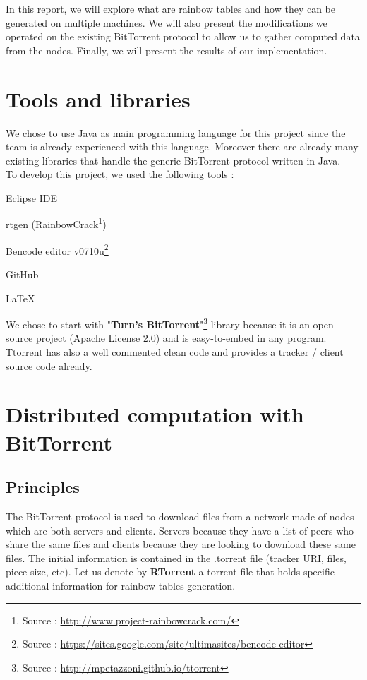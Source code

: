 \documentclass[a4paper]{article}
\begin{document}
{In this report, we will explore what are rainbow tables and how they can be generated on multiple machines. We will also present the modifications we operated on the existing BitTorrent protocol to allow us to gather computed data from the nodes. Finally, we will present the results of our implementation.

\section{Tools and libraries}

We chose to use Java as main programming language for this project since the team is already experienced with this language. Moreover there are already many existing libraries that handle the generic BitTorrent protocol written in Java.\\

To develop this project, we used the following tools :

\begin{listCustom}
	\item Eclipse IDE
	\item rtgen (RainbowCrack\footnote{Source : \url{http://www.project-rainbowcrack.com/}})
	\item Bencode editor v0710u\footnote{Source : \url{https://sites.google.com/site/ultimasites/bencode-editor}}
	\item GitHub
	\item LaTeX
\end{listCustom}

We chose to start with "\textbf{Turn's BitTorrent}"\footnote{Source : \url{http://mpetazzoni.github.io/ttorrent}} library because it is an open-source project (Apache License 2.0) and is easy-to-embed in any program. Ttorrent has also a well commented clean code and provides a tracker / client source code already.

\section{Distributed computation with BitTorrent}

\subsection{Principles}

The BitTorrent protocol is used to download files from a network made of nodes which are both servers and clients. Servers because they have a list of peers who share the same files and clients because they are looking to download these same files. The initial information is contained in the .torrent file (tracker URI, files, piece size, etc). Let us denote by \textbf{RTorrent} a torrent file that holds specific additional information for rainbow tables generation.
\vspace{2mm}

}
\end{document}
